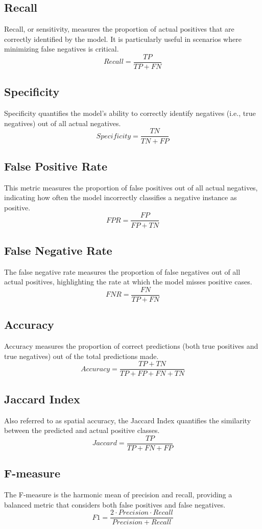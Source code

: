 \documentclass{llncs}
\begin{document}
\subsection{Recall}
Recall, or sensitivity, measures the proportion of actual positives that are correctly identified by the model. It is particularly useful in scenarios where minimizing false negatives is critical.
\[
Recall = \frac{TP}{TP + FN}
\]

\subsection{Specificity}
Specificity quantifies the model's ability to correctly identify negatives (i.e., true negatives) out of all actual negatives.
\[
Specificity = \frac{TN}{TN + FP}
\]

\subsection{False Positive Rate}
This metric measures the proportion of false positives out of all actual negatives, indicating how often the model incorrectly classifies a negative instance as positive.
\[
FPR = \frac{FP}{FP + TN}
\]

\subsection{False Negative Rate}
The false negative rate measures the proportion of false negatives out of all actual positives, highlighting the rate at which the model misses positive cases.
\[
FNR = \frac{FN}{TP + FN}
\]

\subsection{Accuracy}
Accuracy measures the proportion of correct predictions (both true positives and true negatives) out of the total predictions made.
\[
Accuracy = \frac{TP + TN}{TP + FP + FN + TN}
\]

\subsection{Jaccard Index}
Also referred to as spatial accuracy, the Jaccard Index quantifies the similarity between the predicted and actual positive classes.
\[
Jaccard = \frac{TP}{TP + FN + FP}
\]

\subsection{F-measure}
The F-measure is the harmonic mean of precision and recall, providing a balanced metric that considers both false positives and false negatives.
\[
F1 = \frac{2 \cdot Precision \cdot Recall}{Precision + Recall}
\]
\end{document}
